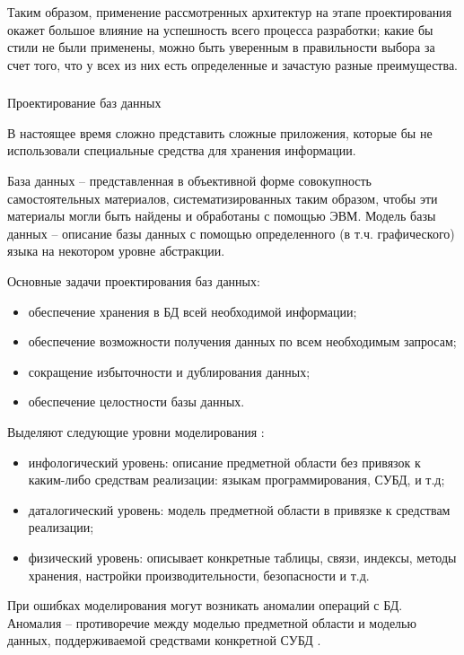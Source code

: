 Таким образом, применение рассмотренных архитектур на этапе проектирования окажет большое влияние на успешность всего
процесса разработки; какие бы стили не были применены, можно быть уверенным в правильности выбора за счет того, что
у всех из них есть определенные и зачастую разные преимущества.

\subsubsection{} Проектирование баз данных
\label{sec:analysis:literature:db}

В настоящее время сложно представить сложные приложения, которые бы не использовали специальные средства для хранения
информации.

База данных -- представленная в объективной форме совокупность самостоятельных материалов, систематизированных таким
образом, чтобы эти материалы могли быть найдены и обработаны с помощью ЭВМ. Модель базы данных -- описание базы данных
с помощью  определенного (в т.ч. графического) языка на некотором уровне абстракции.

Основные задачи проектирования баз данных:
\begin{itemize}
	\item обеспечение хранения в БД всей необходимой информации;
	\item обеспечение возможности получения данных по всем необходимым запросам;
	\item сокращение избыточности и дублирования данных;
	\item обеспечение целостности базы данных.
\end{itemize}

Выделяют следующие уровни моделирования \cite{kulikov_db_workbook}:
\begin{itemize}
	\item инфологический уровень: описание предметной области без привязок к каким-либо средствам реализации: языкам
	программирования, СУБД, и т.д;
	\item даталогический уровень: модель предметной области в привязке к средствам реализации;
	\item физический уровень: описывает конкретные таблицы, связи, индексы, методы хранения, настройки производительности,
	безопасности и т.д.
\end{itemize}

При ошибках моделирования могут возникать аномалии операций с БД. Аномалия -- противоречие между моделью предметной
области и моделью данных, поддерживаемой средствами конкретной СУБД \cite{kulikov_db_workbook}.

